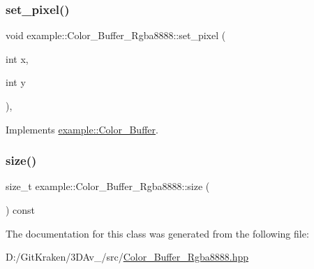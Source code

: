 \subsubsection{\texorpdfstring{set\+\_\+pixel()}{set\_pixel()}\hspace{0.1cm}{\footnotesize\ttfamily [2/2]}}
{\footnotesize\ttfamily void example\+::\+Color\+\_\+\+Buffer\+\_\+\+Rgba8888\+::set\+\_\+pixel (\begin{DoxyParamCaption}\item[{int}]{x,  }\item[{int}]{y }\end{DoxyParamCaption})\hspace{0.3cm}{\ttfamily [inline]}, {\ttfamily [virtual]}}



Implements \mbox{\hyperlink{classexample_1_1_color___buffer_a967ea326ec0889a36db523727a8154b5}{example\+::\+Color\+\_\+\+Buffer}}.

\mbox{\label{classexample_1_1_color___buffer___rgba8888_a635f30dda6b8e1851b444ff6e0d2a092}} 
\subsubsection{\texorpdfstring{size()}{size()}}
{\footnotesize\ttfamily size\+\_\+t example\+::\+Color\+\_\+\+Buffer\+\_\+\+Rgba8888\+::size (\begin{DoxyParamCaption}{ }\end{DoxyParamCaption}) const\hspace{0.3cm}{\ttfamily [inline]}}



The documentation for this class was generated from the following file\+:\begin{DoxyCompactItemize}
\item 
D\+:/\+Git\+Kraken/3\+D\+Av\+\_/src/\mbox{\hyperlink{_color___buffer___rgba8888_8hpp}{Color\+\_\+\+Buffer\+\_\+\+Rgba8888.\+hpp}}\end{DoxyCompactItemize}
